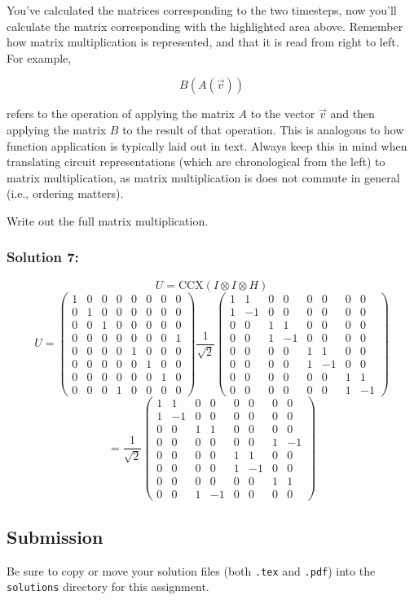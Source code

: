 \documentclass{article}
\begin{document}
\FloatBarrier

You've calculated the matrices corresponding to the two timesteps, now you'll calculate the matrix corresponding with the
highlighted area above. Remember how matrix multiplication is represented, and that it is read from right to left. For example,

\begin{equation*}
    B(A(\vec{v}))
\end{equation*}

\noindent refers to the operation of applying the matrix $A$ to the vector $\vec{v}$ and then applying the matrix $B$ to the result of that operation. This is analogous to how function application is typically laid out in text. Always keep this in mind when translating circuit representations (which are chronological from the left) to matrix multiplication, as matrix multiplication is does not commute in general (i.e., ordering matters).

Write out the full matrix multiplication.

\subsubsection*{Solution 7:}

\vspace{5mm}

\[U=\mathrm{CCX}(I\otimes I\otimes H)\]
\[U=\begin{pmatrix}1&0&0&0&0&0&0&0\\0&1&0&0&0&0&0&0\\0&0&1&0&0&0&0&0\\0&0&0&0&0&0&0&1\\0&0&0&0&1&0&0&0\\0&0&0&0&0&1&0&0\\0&0&0&0&0&0&1&0\\0&0&0&1&0&0&0&0\end{pmatrix}\frac{1}{\sqrt2}\begin{pmatrix}1&1&0&0&0&0&0&0\\1&-1&0&0&0&0&0&0\\0&0&1&1&0&0&0&0\\0&0&1&-1&0&0&0&0\\0&0&0&0&1&1&0&0\\0&0&0&0&1&-1&0&0\\0&0&0&0&0&0&1&1\\0&0&0&0&0&0&1&-1\end{pmatrix}\]
\[=\frac{1}{\sqrt2}\begin{pmatrix}1&1&0&0&0&0&0&0\\1&-1&0&0&0&0&0&0\\0&0&1&1&0&0&0&0\\0&0&0&0&0&0&1&-1\\0&0&0&0&1&1&0&0\\0&0&0&0&1&-1&0&0\\0&0&0&0&0&0&1&1\\0&0&1&-1&0&0&0&0\end{pmatrix}\]

\vspace{5mm}

\FloatBarrier

\subsection*{Submission}

Be sure to copy or move your solution files (both \texttt{.tex} and \texttt{.pdf}) into the \texttt{solutions} directory for this assignment.
\end{document}
